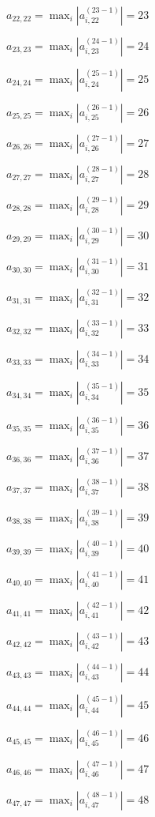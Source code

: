 \documentclass[a4paper,12pt]{article}
\begin{document}
$a _{ 22, 22 } =  \max _i |a _{ i, 22 } ^{ (23 - 1) } | = 23$

$a _{ 23, 23 } =  \max _i |a _{ i, 23 } ^{ (24 - 1) } | = 24$

$a _{ 24, 24 } =  \max _i |a _{ i, 24 } ^{ (25 - 1) } | = 25$

$a _{ 25, 25 } =  \max _i |a _{ i, 25 } ^{ (26 - 1) } | = 26$

$a _{ 26, 26 } =  \max _i |a _{ i, 26 } ^{ (27 - 1) } | = 27$

$a _{ 27, 27 } =  \max _i |a _{ i, 27 } ^{ (28 - 1) } | = 28$

$a _{ 28, 28 } =  \max _i |a _{ i, 28 } ^{ (29 - 1) } | = 29$

$a _{ 29, 29 } =  \max _i |a _{ i, 29 } ^{ (30 - 1) } | = 30$

$a _{ 30, 30 } =  \max _i |a _{ i, 30 } ^{ (31 - 1) } | = 31$

$a _{ 31, 31 } =  \max _i |a _{ i, 31 } ^{ (32 - 1) } | = 32$

$a _{ 32, 32 } =  \max _i |a _{ i, 32 } ^{ (33 - 1) } | = 33$

$a _{ 33, 33 } =  \max _i |a _{ i, 33 } ^{ (34 - 1) } | = 34$

$a _{ 34, 34 } =  \max _i |a _{ i, 34 } ^{ (35 - 1) } | = 35$

$a _{ 35, 35 } =  \max _i |a _{ i, 35 } ^{ (36 - 1) } | = 36$

$a _{ 36, 36 } =  \max _i |a _{ i, 36 } ^{ (37 - 1) } | = 37$

$a _{ 37, 37 } =  \max _i |a _{ i, 37 } ^{ (38 - 1) } | = 38$

$a _{ 38, 38 } =  \max _i |a _{ i, 38 } ^{ (39 - 1) } | = 39$

$a _{ 39, 39 } =  \max _i |a _{ i, 39 } ^{ (40 - 1) } | = 40$

$a _{ 40, 40 } =  \max _i |a _{ i, 40 } ^{ (41 - 1) } | = 41$

$a _{ 41, 41 } =  \max _i |a _{ i, 41 } ^{ (42 - 1) } | = 42$

$a _{ 42, 42 } =  \max _i |a _{ i, 42 } ^{ (43 - 1) } | = 43$

$a _{ 43, 43 } =  \max _i |a _{ i, 43 } ^{ (44 - 1) } | = 44$

$a _{ 44, 44 } =  \max _i |a _{ i, 44 } ^{ (45 - 1) } | = 45$

$a _{ 45, 45 } =  \max _i |a _{ i, 45 } ^{ (46 - 1) } | = 46$

$a _{ 46, 46 } =  \max _i |a _{ i, 46 } ^{ (47 - 1) } | = 47$

$a _{ 47, 47 } =  \max _i |a _{ i, 47 } ^{ (48 - 1) } | = 48$
\end{document}
